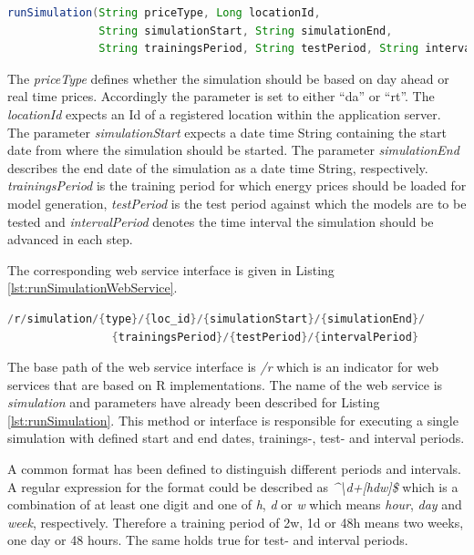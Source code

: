 \begin{minipage}{\linewidth}
\begin{lstlisting}[language=Java, caption=Method runSimulation, label={lst:runSimulation}]
runSimulation(String priceType, Long locationId, 
              String simulationStart, String simulationEnd,
              String trainingsPeriod, String testPeriod, String intervalPeriod)
\end{lstlisting}
\end{minipage}

The \textit{priceType} defines whether the simulation should be based on day ahead or real time prices. Accordingly the parameter is set to either ``da'' or ``rt''. The \textit{locationId} expects an Id of a registered location within the application server. The parameter \textit{simulationStart} expects a date time String containing the start date from where the simulation should be started. The parameter \textit{simulationEnd} describes the end date of the simulation as a date time String, respectively. \textit{trainingsPeriod} is the training period for which energy prices should be loaded for model generation, \textit{testPeriod} is the test period against which the models are to be tested and \textit{intervalPeriod} denotes the time interval the simulation should be advanced in each step. 

The corresponding web service interface is given in Listing \ref{lst:runSimulationWebService}. 

\begin{minipage}{\linewidth}
\begin{lstlisting}[language=Java, caption=Method runSimulation web service interface, label={lst:runSimulationWebService}]
/r/simulation/{type}/{loc_id}/{simulationStart}/{simulationEnd}/
                {trainingsPeriod}/{testPeriod}/{intervalPeriod}
\end{lstlisting}
\end{minipage}

The base path of the web service interface is \textit{/r} which is an indicator for web services that are based on R implementations. The name of the web service is \textit{simulation} and parameters have already been described for Listing \ref{lst:runSimulation}. This method or interface is responsible for executing a single simulation with defined start and end dates, trainings-, test- and interval periods. 

A common format has been defined to distinguish different periods and intervals. A regular expression for the format could be described as \textit{\textasciicircum\textbackslash d+[hdw]\$}
which is a combination of at least one digit and one of \textit{h}, \textit{d} or \textit{w} which means \textit{hour}, \textit{day} and \textit{week}, respectively. 
Therefore a training period of 2w, 1d or 48h means two weeks, one day or 48 hours. The same holds true for test- and interval periods. 


